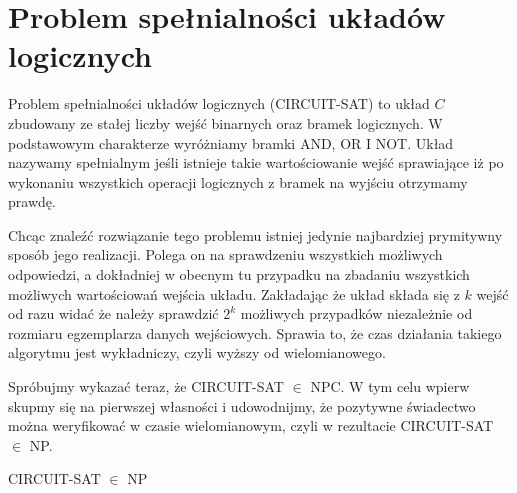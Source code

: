 \section{Problem spełnialności układów logicznych}

Problem spełnialności układów logicznych (CIRCUIT-SAT) to układ $C$ zbudowany ze stałej liczby wejść binarnych oraz bramek logicznych. W podstawowym charakterze wyróżniamy bramki AND, OR I NOT. Układ nazywamy spełnialnym jeśli istnieje takie wartościowanie wejść sprawiające iż po wykonaniu wszystkich operacji logicznych z bramek na wyjściu otrzymamy prawdę.

Chcąc znaleźć rozwiązanie tego problemu istniej jedynie najbardziej prymitywny sposób jego realizacji. Polega on na sprawdzeniu wszystkich możliwych odpowiedzi, a dokładniej w obecnym tu przypadku na zbadaniu wszystkich możliwych wartościowań wejścia układu. Zakładając że układ składa się z $k$ wejść od razu widać że należy sprawdzić $2^{k}$ możliwych przypadków niezależnie od rozmiaru egzemplarza danych wejściowych. Sprawia to, że czas działania takiego algorytmu jest wykładniczy, czyli wyższy od wielomianowego.

Spróbujmy wykazać teraz, że CIRCUIT-SAT $\in$ NPC. W tym celu wpierw skupmy się na pierwszej własności i udowodnijmy, że pozytywne świadectwo można weryfikować w czasie wielomianowym, czyli w rezultacie CIRCUIT-SAT $\in$ NP.

\begin{lem} 
CIRCUIT-SAT $\in$ NP
\end{lem}

